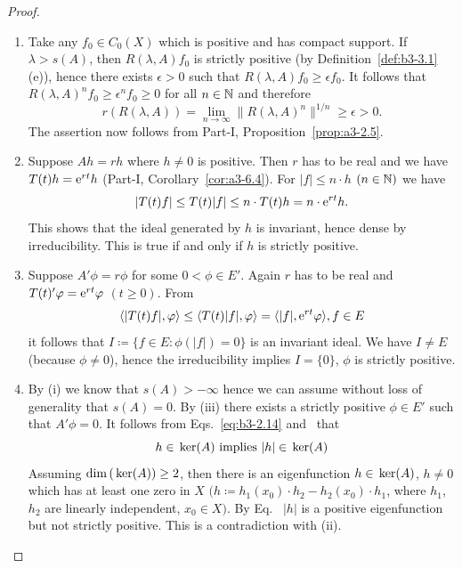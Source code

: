 \begin{proof} 
\begin{enumerate}[\upshape (i), wide, labelindent=.25em]
	\item 
	Take any $f_{0} \in C_{0}(X)$ which is positive and has compact support.
	If\/ $\lambda > s(A)$, then $R(\lambda,A)f_{0}$ is strictly positive (by Definition~\ref{def:b3-3.1}\,(e)), hence there exists $\epsilon > 0$ such that $R(\lambda,A)f_{0} \geq \epsilon f_{0}$.
	It follows that $R(\lambda,A)^nf_{0} \geq \epsilon^nf_{0} \geq 0$ for all $n \in \mathbb{N}$ and therefore
	\[
    r(R(\lambda,A)) = \lim_{n \to \infty}\|R(\lambda,A)^{n}\|^{1/n} \geq \epsilon > 0 .
    \]
	The assertion now follows from Part-I, Proposition~\ref{prop:a3-2.5}.	

	\item 
	Suppose $Ah = rh$ where $h \neq 0$ is positive.
	Then $r$ has to be real and we have $T(t)h = \mathrm{e}^{rt}h$ (Part-I, Corollary~\ref{cor:a3-6.4}).
	For $|f| \leq n\cdot h$ $(n \in \mathbb{N})$ we have
	\begin{equation}\label{eq:b3-3.2}
		|T(t)f| \leq T(t)|f| \leq n\cdot T(t)h = n\cdot \eu^{rt}h.		
	\end{equation}
		This shows that the ideal generated by $h$ is invariant, hence dense by irreducibility.
	This is true if and only if\/ $h$ is strictly positive.
	
	\item 
	Suppose $A'\phi = r\phi$ for some $0 < \phi \in E'$.
	Again $r$ has to be real and $T(t)'\phi = \eu^{rt}\phi$ $(t \geq 0)$.
	From
	\begin{equation}\label{eq:b3-3.3}
	\langle|T(t)f|,\phi\rangle \leq \langle T(t)|f|,\phi\rangle = \langle|f|,\eu^{rt}\phi\rangle, f \in E			
	\end{equation}
	it follows that $I \coloneq \{f \in E \colon \phi(|f|) = 0\}$ is an invariant ideal.
	We have $I \neq E$ (because $\phi \neq 0$), hence the irreducibility implies $I = \{0\}$, \ie $\phi$ is strictly positive.
	
	\item 
	By (i) we know that $s(A) > -\infty$ hence we can assume without loss of generality that $s(A) = 0$.
	By (iii) there exists a strictly positive $\phi \in E'$ such that $A'\phi = 0$.
	It follows from Eqs.~\eqref{eq:b3-2.14} and~ that
	\begin{equation}\label{eq:b3-3.4}
	h \in \mathop{}\mathrm{ker}(A) \text{ implies } |h| \in \mathop{}\mathrm{ker}(A)
	\end{equation}
	Assuming $\dim(\Kern{A}) \geq 2$, then there is an eigenfunction $h \in \mathop{}\mathrm{ker}(A)$, $h \neq 0$ which has at least one zero in $X$ $(h \coloneq h_{1}(x_{0})\cdot h_{2} - h_{2}(x_{0})\cdot h_{1}$, where $h_{1}$, $h_{2}$ are linearly independent, $x_{0} \in X)$.
	By Eq.~ $|h|$ is a positive eigenfunction but not strictly positive.
	This is a contradiction with (ii).
	

\end{enumerate}
\end{proof}
